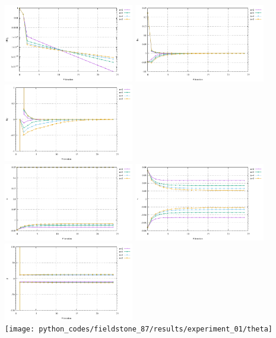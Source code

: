 \begin{center}
\includegraphics[width=5.7cm]{python_codes/fieldstone_87/results/experiment_01/conv}
\includegraphics[width=5.7cm]{python_codes/fieldstone_87/results/experiment_01/du}
\includegraphics[width=5.7cm]{python_codes/fieldstone_87/results/experiment_01/dp}\\
\includegraphics[width=5.7cm]{python_codes/fieldstone_87/results/experiment_01/u}
\includegraphics[width=5.7cm]{python_codes/fieldstone_87/results/experiment_01/v}
\includegraphics[width=5.7cm]{python_codes/fieldstone_87/results/experiment_01/p}\\
\texttt{[image: python\_codes/fieldstone\_87/results/experiment\_01/theta]}
\end{center}


